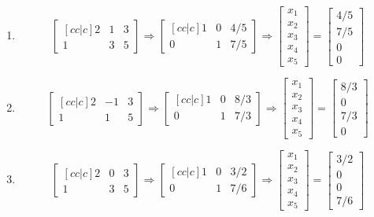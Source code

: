 \documentclass[12pt]{extarticle}
\theoremstyle{definition}
\begin{document}
\begin{problem}
	\begin{enumerate}
	\item $$\begin{bmatrix}[cc|c] 2&1&3\\1&3&5 \end{bmatrix} \Longrightarrow 
		\begin{bmatrix}[cc|c] 1&0&4/5\\0&1&7/5 \end{bmatrix} \Longrightarrow
		\begin{bmatrix} x_1\\x_2\\x_3\\x_4\\x_5 \end{bmatrix} = \begin{bmatrix} 4/5\\7/5\\0\\0\end{bmatrix}$$ 
	\item $$\begin{bmatrix}[cc|c] 2&-1&3\\1&1&5 \end{bmatrix} \Longrightarrow
		\begin{bmatrix}[cc|c] 1&0&8/3\\0&1&7/3 \end{bmatrix} \Longrightarrow
		\begin{bmatrix} x_1\\x_2\\x_3\\x_4\\x_5 \end{bmatrix} = \begin{bmatrix} 8/3\\0\\7/3\\0\end{bmatrix}$$
	\item $$\begin{bmatrix}[cc|c] 2&0&3\\1&3&5 \end{bmatrix} \Longrightarrow
		\begin{bmatrix}[cc|c] 1&0&3/2\\0&1&7/6 \end{bmatrix} \Longrightarrow
		\begin{bmatrix} x_1\\x_2\\x_3\\x_4\\x_5 \end{bmatrix} = \begin{bmatrix} 3/2\\0\\0\\7/6\end{bmatrix}$$

\end{enumerate}
\end{problem}
\end{document}
